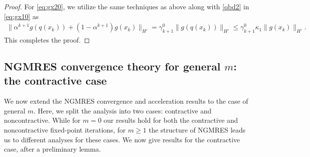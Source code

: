 \documentclass{article}
\numberwithin{equation}{section}
\begin{document}
\begin{proof}
 For \eqref{eq:gx20}, we utilize the same techniques as above along with \eqref{qbd2} in \eqref{eq:gx10} as
  \begin{align*}
      \| \alpha^{k+1} g(q(x_k)) + (1-\alpha^{k+1})g(x_k) \|_{H'} = \gamma^0_{k+1} \| g(q(x_k))\|_{H'} \le \gamma_{k+1}^0 \kappa_1 \| g(x_k)\|_{H'}.
  \end{align*} 
  This completes the proof.
\end{proof}


\subsection{NGMRES convergence theory for general $m$: the contractive case}

We now extend the NGMRES convergence and acceleration results to the case of general $m$.  Here, we split the analysis into two cases: contractive and noncontractive.  While for $m=0$ our results hold for both the contractive and noncontractive fixed-point iterations, for $m\ge 1$ the structure of NGMRES leads us to different analyses for these cases.  We now give results for the contractive case, after a preliminary lemma.
\end{document}
